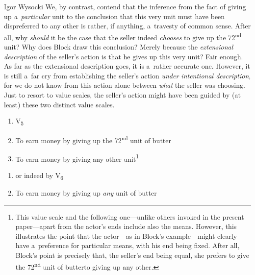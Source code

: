 \begin{artengenv}{Igor Wysocki}
We, by contrast, contend that the inference from the fact of giving up \textit{a~particular} unit to the conclusion that this very unit must have been dispreferred to any other is rather, if anything, a~travesty of common sense. After all, why \textit{should} it be the case that the seller indeed \textit{chooses} to give up the 72\textsuperscript{nd} unit? Why does Block draw this conclusion? Merely because the \textit{extensional description} of the seller's action is that he gives up this very unit? Fair enough. As far as the extensional description goes, it is a~rather accurate one. However, it is still a~far cry from establishing the seller's action \textit{under intentional description}, for we do not know from this action alone between \textit{what} the seller was choosing. Just to resort to value scales, the seller's action might have been guided by (at least) these two distinct value scales.






\begin{enumerate}[label=(\arabic*)]

\item[]\makebox[-1.7em][l]{}V\textsubscript{5}

\item To earn money by giving up the 72\textsuperscript{nd }unit of butter

\item To earn money by giving any other unit\footnote{This value scale and the following one---unlike others invoked in the present paper---apart from the actor's ends include also the means. However, this illustrates the point that the actor---as in Block's example---might clearly have a~preference for particular means, with his end being fixed. After all, Block's point is precisely that, the seller's end being equal, she prefers to give the 72\textsuperscript{nd }unit of butterto giving up any other. }

\end{enumerate}




\begin{enumerate}[label=(\arabic*)]

\item[]\makebox[-1.7em][l]{}or indeed by V\textsubscript{6}

\item To earn money by giving up \textit{any} unit of butter


\end{enumerate}
\end{artengenv}
